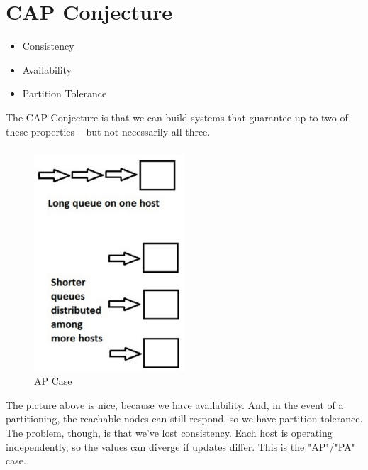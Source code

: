 \section{CAP Conjecture}
\begin{itemize}
    \item Consistency
    \item Availability
    \item Partition Tolerance
\end{itemize}
The CAP Conjecture is that we can build systems that guarantee up to two of these properties -- but not necessarily all three. 

\subsubsection{}
\begin{figure}
\centering
\includegraphics[width=0.5\textwidth]{img/ch07-apcase.png}
\caption{AP Case}
\label{fig:ch07-apcase}
\end{figure}
The picture above is nice, because we have availability. And, in the event of a partitioning, the reachable nodes can still respond, so we have partition tolerance. The problem, though, is that we've lost consistency. Each host is operating independently, so the values can diverge if updates differ. This is the "AP"/"PA" case.
\\

